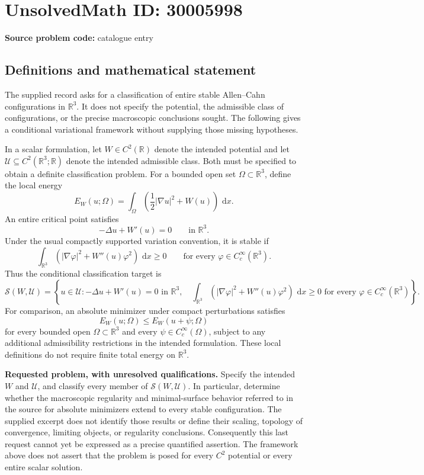 \documentclass[11pt]{article}
\newcommand{\R}{\mathbb{R}}
\newcommand{\dd}{\,\mathrm{d}}
\begin{document}
\section*{UnsolvedMath ID: 30005998}
\textbf{Source problem code:} catalogue entry
\subsection{Definitions and mathematical statement}
The supplied record asks for a classification of entire stable Allen--Cahn configurations in \(\R^3\). It does not specify the potential, the admissible class of configurations, or the precise macroscopic conclusions sought. The following gives a conditional variational framework without supplying those missing hypotheses.

In a scalar formulation, let \(W\in C^2(\R)\) denote the intended potential and let \(\mathcal U\subseteq C^2(\R^3;\R)\) denote the intended admissible class. Both must be specified to obtain a definite classification problem. For a bounded open set \(\Omega\subset\R^3\), define the local energy
\[
 E_W(u;\Omega)=\int_\Omega\left(\frac12|\nabla u|^2+W(u)\right)\,\dd x.
\]
An entire critical point satisfies
\[
 -\Delta u+W'(u)=0\qquad\text{in }\R^3.
\]
Under the usual compactly supported variation convention, it is stable if
\[
 \int_{\R^3}\left(|\nabla\varphi|^2+W''(u)\varphi^2\right)\,\dd x\geq0
 \qquad\text{for every }\varphi\in C_c^\infty(\R^3).
\]
Thus the conditional classification target is
\[
 \mathcal S(W,\mathcal U)=\left\{u\in\mathcal U:
 -\Delta u+W'(u)=0\text{ in }\R^3,\quad
 \int_{\R^3}\left(|\nabla\varphi|^2+W''(u)\varphi^2\right)\,\dd x\geq0
 \text{ for every }\varphi\in C_c^\infty(\R^3)
 \right\}.
\]
For comparison, an absolute minimizer under compact perturbations satisfies
\[
 E_W(u;\Omega)\leq E_W(u+\psi;\Omega)
\]
for every bounded open \(\Omega\subset\R^3\) and every \(\psi\in C_c^\infty(\Omega)\), subject to any additional admissibility restrictions in the intended formulation. These local definitions do not require finite total energy on \(\R^3\).

\textbf{Requested problem, with unresolved qualifications.} Specify the intended \(W\) and \(\mathcal U\), and classify every member of \(\mathcal S(W,\mathcal U)\). In particular, determine whether the macroscopic regularity and minimal-surface behavior referred to in the source for absolute minimizers extend to every stable configuration. The supplied excerpt does not identify those results or define their scaling, topology of convergence, limiting objects, or regularity conclusions. Consequently this last request cannot yet be expressed as a precise quantified assertion. The framework above does not assert that the problem is posed for every \(C^2\) potential or every entire scalar solution.
\end{document}

